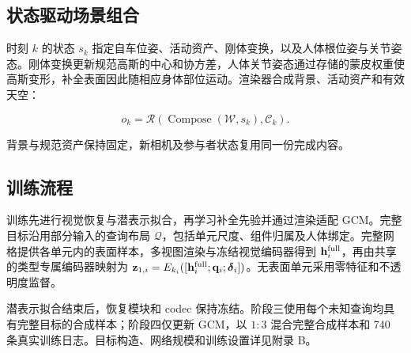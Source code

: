 \subsection{状态驱动场景组合}
\label{sec:composition}

时刻 $k$ 的状态 $s_k$ 指定自车位姿、活动资产、刚体变换，以及人体根位姿与关节姿态。刚体变换更新规范高斯的中心和协方差，人体关节姿态通过存储的蒙皮权重使高斯变形，补全表面因此随相应身体部位运动。渲染器合成背景、活动资产和有效天空：

\begin{equation}
o_k=\mathcal R(\operatorname{Compose}(\mathcal W,s_k),\mathcal C_k).
\label{eq:simulation}
\end{equation}

背景与规范资产保持固定，新相机及参与者状态复用同一份完成内容。

\subsection{训练流程}
\label{sec:training}
训练先进行视觉恢复与潜表示拟合，再学习补全先验并通过渲染适配 GCM。完整目标沿用部分输入的查询布局 $\mathcal Q$，包括单元尺度、组件归属及人体绑定。完整网格提供各单元内的表面样本，多视图渲染与冻结视觉编码器得到 $\mathbf h_i^{\rm full}$，再由共享的类型专属编码器映射为 $\mathbf z_{1,i}=E_{k_i}([\mathbf h_i^{\rm full};\mathbf q_i;\boldsymbol\delta_i])$。无表面单元采用零特征和不透明度监督。

潜表示拟合结束后，恢复模块和 codec 保持冻结。阶段三使用每个未知查询均具有完整目标的合成样本；阶段四仅更新 GCM，以 $1{:}3$ 混合完整合成样本和 740 条真实训练日志。目标构造、网络规模和训练设置详见附录 B。
